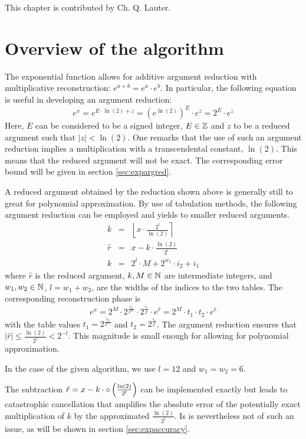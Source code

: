 This chapter is contributed by Ch. Q. Lauter.


\section{Overview of the algorithm}
The exponential function allows for additive argument reduction with
multiplicative reconstruction: $e^{a + b} = e^a \cdot e^b$. In
particular, the following equation is useful in developing an
argument reduction:
$$e^x = e^{E \cdot \ln\left(2\right) + z} = \left(e^{\ln\left( 2
\right)}\right)^E \cdot e^z = 2^E \cdot e^z$$ Here, $E$ can be
considered to be a signed integer, $E \in \mathbb {Z}$ and $z$ to be a reduced
argument such that $\left \vert z \right \vert <
\ln\left(2\right)$. One remarks that the use of such an argument
reduction implies a multiplication with a transcendental constant,
$\ln\left( 2 \right)$.  This means that the reduced argument will not
be exact. The corresponding error bound will be given in section
\ref{sec:expargred}.

A reduced argument obtained by the reduction shown above is generally
still to great for polynomial approximation. By use of tabulation
methods, the following argument reduction can be employed and yields
to smaller reduced arguments.
\begin{eqnarray*}
k & = & \left \lfloor x \cdot \frac{2^l}{\ln\left(2 \right)} \right \rceil \\
\hat{r} & = & x - k \cdot \frac{\ln\left( 2 \right)}{2^l} \\
k & = & 2^l \cdot M + 2^{w_1} \cdot i_2 + i_1 
\end{eqnarray*}
where $\hat{r}$ is the reduced argument, $k, M \in \mathbb {N}$ are intermediate
integers, and $w_1, w_2 \in \mathbb {N}$, $l = w_1 + w_2$, are the widths of
the indices to the two tables. The corresponding reconstruction phase
is
$$e^x = 2^M \cdot 2^{\frac{i_2}{2^{w_1}}} \cdot 2^{\frac{i_1}{2^l}}
\cdot e^{\hat{r}} = 2^M \cdot t_1 \cdot t_2 \cdot e^{\hat{r}}$$ with the table values $t_1 =
2^{\frac{i_2}{2^{w_1}}}$ and $t_2 = 2^{\frac{i_1}{2^l}}$. The argument
reduction ensures that $\left \vert \hat{r} \right \vert \leq
\frac{\ln\left( 2 \right)}{2^l} < 2^{-l}$. This magnitude is small enough for 
allowing for polynomial approximation.

In the case of the given algorithm, we use $l = 12$ and $w_1 = w_2 = 6$.

The subtraction $\hat{r} = x - k \cdot \circ \left(\frac{\ln\left( 2
\right)}{2^l}\right)$ can be implemented exactly but leads to
catastrophic cancellation that amplifies the absolute error of the
potentially exact multiplication of $k$ by the approximated
$\frac{\ln\left( 2 \right)}{2^l}$. Is is nevertheless not of such an
issue, as will be shown in section \ref{sec:expaccuracy}.                  %

